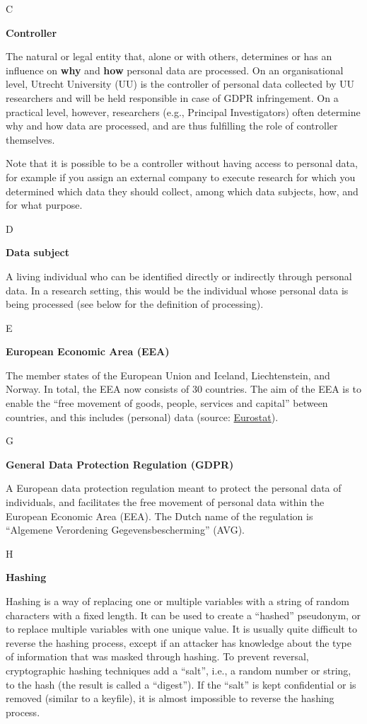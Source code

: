 \documentclass[
]{book}
\begin{document}
C

\textbf{Controller}

The natural or legal entity that, alone or with others, determines or has an influence on \textbf{why} and \textbf{how} personal data are processed. On an organisational level, Utrecht University (UU) is the controller of personal data collected by UU researchers and will be held responsible in case of GDPR
infringement. On a practical level, however, researchers (e.g., Principal Investigators) often determine why and how data are processed, and are thus fulfilling the role of controller themselves.

Note that it is possible to be a controller without having access to personal data, for example if you assign an external company to execute research for which you determined which data they should collect, among which data subjects, how, and for what purpose.

D

\textbf{Data subject}

A living individual who can be identified directly or indirectly through personal data. In a research setting, this would be the individual whose personal data is being processed (see below for the definition of processing).

E

\textbf{European Economic Area (EEA)}

The member states of the European Union and Iceland, Liechtenstein, and Norway. In total, the EEA now consists of 30 countries. The aim of the EEA is to enable the ``free movement of goods, people, services and capital'' between countries, and this includes (personal) data (source: \href{https://ec.europa.eu/eurostat/statistics-explained/index.php?title=Glossary:European_Economic_Area_(EEA)}{Eurostat}).

G

\textbf{General Data Protection Regulation (GDPR)}

A European data protection regulation meant to protect the personal data of individuals, and facilitates the free movement of personal data within the European Economic Area (EEA). The Dutch name of the regulation is ``Algemene Verordening Gegevensbescherming'' (AVG).

H

\textbf{Hashing}

Hashing is a way of replacing one or multiple variables with a string of random characters with a fixed length. It can be used to create a ``hashed'' pseudonym, or to replace multiple variables with one unique value. It is usually quite difficult to reverse the hashing process, except if an attacker has knowledge about the type of information that was masked through hashing. To prevent reversal, cryptographic hashing techniques add a ``salt'', i.e., a random number or string, to the hash (the result is called a ``digest''). If the ``salt'' is kept confidential or is removed (similar to a keyfile), it is almost impossible to reverse the hashing process.
\end{document}
